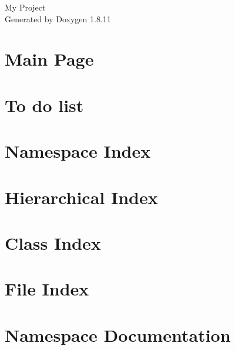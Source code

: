 \documentclass[twoside]{book}
\newcommand{\+}{\discretionary{\mbox{\scriptsize$\hookleftarrow$}}{}{}}
\newcommand{\clearemptydoublepage}{%
  \newpage{\pagestyle{empty}\cleardoublepage}%
}
\begin{document}
\hypersetup{pageanchor=false,
             bookmarksnumbered=true,
             pdfencoding=unicode
            }
\begin{titlepage}
\vspace*{7cm}
\begin{center}%
{\Large My Project }\\
\vspace*{1cm}
{\large Generated by Doxygen 1.8.11}\\
\end{center}
\end{titlepage}
\clearemptydoublepage
\tableofcontents
\clearemptydoublepage
{}
\hypersetup{pageanchor=true}

\chapter{Main Page}
\label{index}\hypertarget{index}{}
\chapter{To do list}
\label{todo}
\hypertarget{todo}{}

\chapter{Namespace Index}

\chapter{Hierarchical Index}

\chapter{Class Index}

\chapter{File Index}

\chapter{Namespace Documentation}



\end{document}
